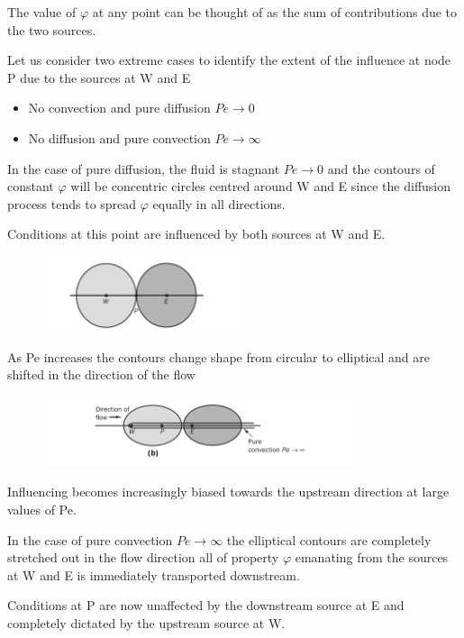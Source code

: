 \documentclass[a4paper, 15pt]{article}
\begin{document}
The
value of $\varphi$ at any point can be thought of as the sum of contributions due to the two sources.

Let
us consider two extreme cases to identify the extent of the influence at node P due to the
sources at W and E
\begin{itemize}
\item No convection and pure diffusion $Pe\rightarrow0$
\item No diffusion and pure convection $Pe\rightarrow\infty$
\end{itemize}
In
the case of pure diffusion, the fluid is stagnant $Pe\rightarrow0$ and the contours of constant $\varphi$ will be
concentric circles centred around W and E since the diffusion process tends to spread $\varphi$ equally
in all directions. 

Conditions at this point are
influenced by both sources at W and E.
\begin{figure}[H]
	\centering
	\includegraphics[width=0.5\linewidth]{fig/screenshot014}
	\label{fig:screenshot014}
\end{figure}
As Pe increases the contours change shape from circular to elliptical and are shifted in the
direction of the flow
\begin{figure}[H]
	\centering
	\includegraphics[width=0.5\linewidth]{fig/screenshot015}
	\label{fig:screenshot015}
\end{figure}
Influencing
becomes increasingly biased towards the upstream direction at large values of Pe.

In
the case of pure convection $Pe\rightarrow\infty$ the elliptical contours are completely stretched out in the
flow direction all of property $\varphi$ emanating from the sources at W and E is immediately
transported downstream. \newline 

Conditions at P are now unaffected by the downstream source at E and completely dictated
by the upstream source at W. \newline 
\end{document}
